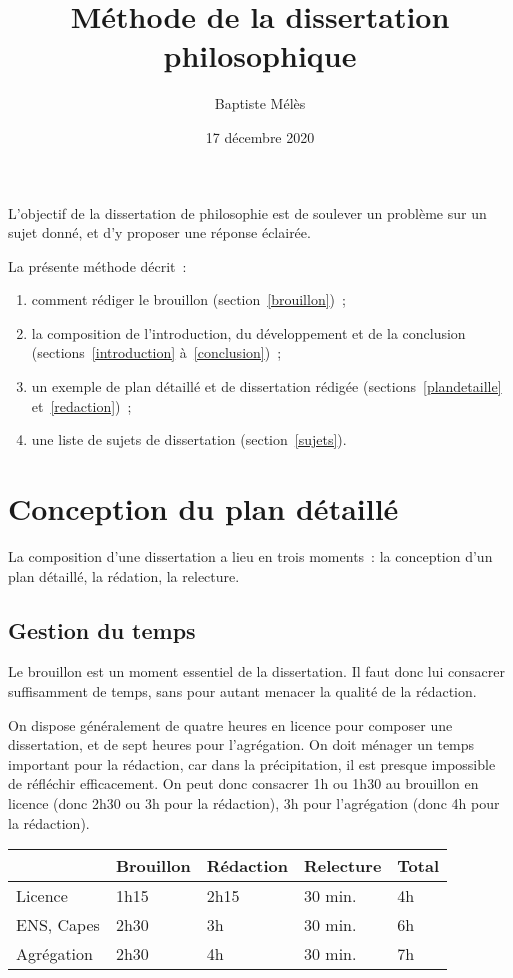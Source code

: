 \documentclass[a4paper,12pt]{article}
\author{Baptiste Mélès}
\date{17 décembre 2020}
\title{Méthode de la dissertation philosophique}
\begin{document}
\maketitle
\setcounter{tocdepth}{3}
\tableofcontents

\bigskip

L'objectif de la dissertation de philosophie est de soulever un problème
sur un sujet donné, et d'y proposer une réponse éclairée.

La présente méthode décrit : 
\begin{enumerate}
\item comment rédiger le brouillon (section \ref{brouillon}) ;
\item la composition de l'introduction, du développement et de la conclusion
(sections \ref{introduction} à \ref{conclusion}) ;
\item un exemple de plan détaillé et de dissertation rédigée
(sections \ref{plandetaille} et \ref{redaction}) ;
\item une liste de sujets de dissertation (section \ref{sujets}).
\end{enumerate}

\section{Conception du plan détaillé}
\label{sec-1}
\label{brouillon}

La composition d'une dissertation a lieu en trois moments : la
conception d'un plan détaillé, la rédation, la relecture.

\subsection{Gestion du temps}
\label{sec-1-1}

Le brouillon est un moment essentiel de la dissertation. Il faut donc
lui consacrer suffisamment de temps, sans pour autant menacer la qualité
de la rédaction.

On dispose généralement de quatre heures en licence pour composer une
dissertation, et de sept heures pour l'agrégation. On doit ménager un
temps important pour la rédaction, car dans la précipitation, il est
presque impossible de réfléchir efficacement. On peut donc consacrer 1h
ou 1h30 au brouillon en licence (donc 2h30 ou 3h pour la rédaction), 3h
pour l'agrégation (donc 4h pour la rédaction).

\begin{center}
\begin{tabular}{|l|l|l|l|l|}
\hline
 & Brouillon & Rédaction & Relecture & Total\\
\hline
Licence & 1h15 & 2h15 & 30 min. & 4h\\
ENS, Capes & 2h30 & 3h & 30 min. & 6h\\
Agrégation & 2h30 & 4h & 30 min. & 7h\\
\hline
\end{tabular}
\end{center}
\end{document}
